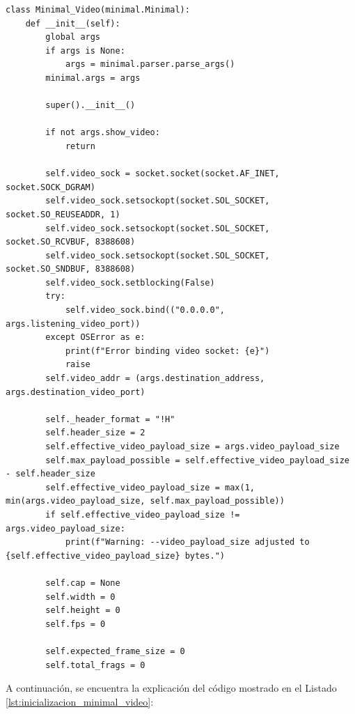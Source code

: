 \begin{lstlisting}[style=pythonstyle, caption={Comienzo de la clase \textit{Minimal\_Video} y parte de la inicialización.}, label={lst:inicializacion_minimal_video}]
class Minimal_Video(minimal.Minimal):
    def __init__(self):
        global args
        if args is None:
            args = minimal.parser.parse_args()
        minimal.args = args

        super().__init__()

        if not args.show_video:
            return

        self.video_sock = socket.socket(socket.AF_INET, socket.SOCK_DGRAM)
        self.video_sock.setsockopt(socket.SOL_SOCKET, socket.SO_REUSEADDR, 1)
        self.video_sock.setsockopt(socket.SOL_SOCKET, socket.SO_RCVBUF, 8388608)
        self.video_sock.setsockopt(socket.SOL_SOCKET, socket.SO_SNDBUF, 8388608)
        self.video_sock.setblocking(False)
        try:
            self.video_sock.bind(("0.0.0.0", args.listening_video_port))
        except OSError as e:
            print(f"Error binding video socket: {e}")
            raise
        self.video_addr = (args.destination_address, args.destination_video_port)

        self._header_format = "!H"
        self.header_size = 2
        self.effective_video_payload_size = args.video_payload_size
        self.max_payload_possible = self.effective_video_payload_size - self.header_size
        self.effective_video_payload_size = max(1, min(args.video_payload_size, self.max_payload_possible))
        if self.effective_video_payload_size != args.video_payload_size:
            print(f"Warning: --video_payload_size adjusted to {self.effective_video_payload_size} bytes.")

        self.cap = None
        self.width = 0
        self.height = 0
        self.fps = 0

        self.expected_frame_size = 0
        self.total_frags = 0
\end{lstlisting}

A continuación, se encuentra la explicación del código mostrado en el Listado \ref{lst:inicializacion_minimal_video}:

